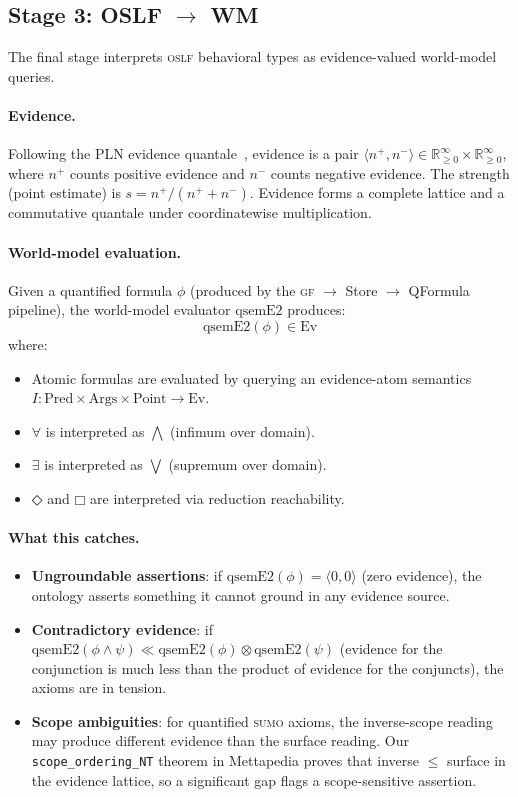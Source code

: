 \documentclass[11pt]{article}
\newcommand{\DiamondOp}{\mathbin{\Diamond}}
\newcommand{\BoxOp}{\mathbin{\Box}}
\newcommand{\SUMO}{\textsc{sumo}}
\newcommand{\GF}{\textsc{gf}}
\newcommand{\OSLF}{\textsc{oslf}}
\newcommand{\ev}[2]{\langle #1, #2 \rangle}
\newcommand{\Ev}{\mathrm{Ev}}
\theoremstyle{definition}
\theoremstyle{plain}
\begin{document}
\subsection{Stage 3: OSLF $\to$ WM}
\label{sec:stage3}

The final stage interprets \OSLF{} behavioral types as evidence-valued
world-model queries.

\paragraph{Evidence.}
Following the PLN evidence quantale~\cite{goertzel2008pln},
evidence is a pair $\ev{n^+}{n^-} \in \mathbb{R}_{\geq 0}^{\infty}
\times \mathbb{R}_{\geq 0}^{\infty}$, where $n^+$ counts positive
evidence and $n^-$ counts negative evidence.
The strength (point estimate) is $s = n^+ / (n^+ + n^-)$.
Evidence forms a complete lattice and a commutative quantale under
coordinatewise multiplication.

\paragraph{World-model evaluation.}
Given a quantified formula $\phi$ (produced by the \GF{} $\to$ Store
$\to$ QFormula pipeline), the world-model evaluator $\mathrm{qsemE2}$
produces:
\[
  \mathrm{qsemE2}(\phi) \in \Ev
\]
where:
\begin{itemize}[nosep]
  \item Atomic formulas are evaluated by querying an evidence-atom
    semantics $I : \text{Pred} \times \text{Args} \times \text{Point}
    \to \Ev$.
  \item $\forall$ is interpreted as $\bigwedge$ (infimum over domain).
  \item $\exists$ is interpreted as $\bigvee$ (supremum over domain).
  \item $\DiamondOp$ and $\BoxOp$ are interpreted via reduction
    reachability.
\end{itemize}

\paragraph{What this catches.}

\begin{itemize}[nosep]
  \item \textbf{Ungroundable assertions}: if $\mathrm{qsemE2}(\phi) = \ev{0}{0}$
    (zero evidence), the ontology asserts something it cannot ground
    in any evidence source.
  \item \textbf{Contradictory evidence}: if $\mathrm{qsemE2}(\phi \wedge \psi)
    \ll \mathrm{qsemE2}(\phi) \otimes \mathrm{qsemE2}(\psi)$ (evidence
    for the conjunction is much less than the product of evidence for
    the conjuncts), the axioms are in tension.
  \item \textbf{Scope ambiguities}: for quantified \SUMO{} axioms, the
    inverse-scope reading may produce different evidence than the
    surface reading.  Our \texttt{scope\_ordering\_NT} theorem in
    Mettapedia proves that inverse $\leq$ surface in the evidence
    lattice, so a significant gap flags a scope-sensitive assertion.
\end{itemize}
\end{document}
